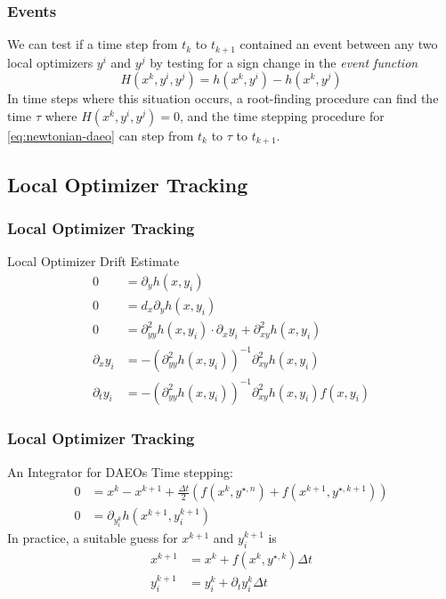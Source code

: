 \documentclass[10pt]{beamer}
\begin{document}
\begin{frame}
	\frametitle{Events}
	We can test if a time step from $t_k$ to $t_{k+1}$ contained an event between any two local optimizers $y^i$ and $y^j$ by testing for a sign change in the \textit{event function}
	\begin{equation}
		H(x^k, y^i, y^j) = h(x^k, y^i) - h(x^k, y^j)
	\end{equation}
	\vfill
	\vfill
	In time steps where this situation occurs, a root-finding procedure can find the time $\tau$ where $H(x^k, y^i, y^j) = 0$, and the time stepping procedure for \eqref{eq:newtonian-daeo} can step from $t_k$ to $\tau$ to $t_{k+1}$.
	\vfill
\end{frame}

\subsection{Local Optimizer Tracking}

\begin{frame}
	\frametitle{Local Optimizer Tracking}
	\begin{block}{Local Optimizer Drift Estimate}
	\begin{equation}
		\label{eq:local-tracking-guess}
		\begin{aligned}
			0&=\partial_{y}h(x, y_i)\\
			0&=d_x\partial_yh(x, y_i)\\
			0&=\partial^2_{yy}h(x, y_i)\cdot\partial_xy_i + \partial^2_{xy}h(x,y_i)\\
			\partial_xy_i &= -\left(\partial^2_{yy}h(x,y_i)\right)^{-1}\partial^2_{xy}h(x, y_i)\\
			\partial_ty_i &= -\left(\partial^2_{yy}h(x,y_i)\right)^{-1}\partial^2_{xy}h(x, y_i)f(x, y_i)
		\end{aligned}
	\end{equation}
	\end{block}
\end{frame}

\begin{frame}
	\frametitle{Local Optimizer Tracking}
	\begin{block}{An Integrator for DAEOs}
			Time stepping:
		\begin{equation}
			\label{eq:integrator-with-tracking}
			\begin{aligned}
				0 &= x^k - x^{k+1} + \frac{\Delta t}{2}\left(f(x^k, 	y^{\star,n})+f(x^{k+1}, y^{\star,k+1})\right)\\
				0 &= \partial_{y^k_i}h\left(x^{k+1}, y^{k+1}_i\right)
			\end{aligned}
		\end{equation}
		In practice, a suitable guess for $x^{k+1}$ and $y_i^{k+1}$ is
		\begin{equation*}
			\begin{aligned}
				x^{k+1} &= x^k + f(x^k, y^{\star, k})\Delta t\\
				y_i^{k+1} &= y_i^k + \partial_ty_i^k \Delta t
			\end{aligned}
		\end{equation*}
	\end{block}
\end{frame}
\end{document}
